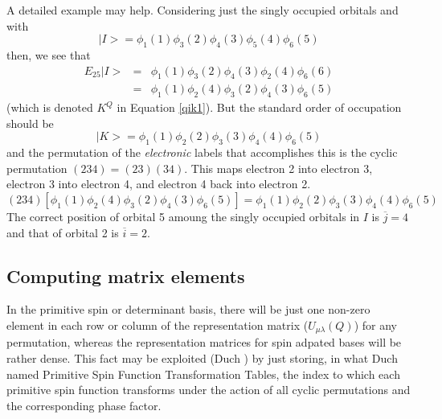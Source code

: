 \documentclass[fullpage,12pt,fleqn]{article}
\begin{document}
A detailed example may help. Considering just the singly occupied
orbitals and with
\begin{equation}
 |I \! > = \phi_1(1) \phi_3(2) \phi_4(3) \phi_5(4) \phi_6(5)
\end{equation}
then, we see that 
\begin{eqnarray}
  E_{25} |I \! >  & = & \phi_1(1) \phi_3(2) \phi_4(3) \phi_2(4)
\phi_6(6) \\
 & = & \phi_1(1) \phi_2(4) \phi_3(2) \phi_4(3) \phi_6(5) 
\end{eqnarray}
(which is denoted $K^Q$ in Equation \ref{qik1}).  But the standard
order of occupation should be
\begin{equation}
  |K \! >  =  \phi_1(1) \phi_2(2) \phi_3(3) \phi_4(4) \phi_6(5)
\end{equation}
and the permutation of the {\em electronic} labels that accomplishes
this is the cyclic permutation $(2 3 4) = (2 3)(3 4)$.  This maps
electron 2 into electron 3, electron 3 into electron 4, and electron 4
back into electron 2.
\begin{equation}
  (2 3 4) \left[ \phi_1(1) \phi_2(4) \phi_3(2) \phi_4(3) \phi_6(5) 
\right] = \phi_1(1) \phi_2(2) \phi_3(3) \phi_4(4) \phi_6(5)
\end{equation}
The correct position of orbital 5 amoung the singly occupied orbitals
in $I$ is $\overline{j}=4$ and that of orbital 2 is $\overline{i}=2$.

\subsection{Computing matrix elements}

In the primitive spin or determinant basis, there will be just one
non-zero element in each row or column of the representation matrix
($U_{\mu \lambda}(Q)$) for any permutation, whereas the representation
matrices for spin adpated bases will be rather dense.  This fact may
be exploited (Duch \cite{duchspinad}) by just storing, in what Duch
named Primitive Spin Function Transformation Tables, the index to which
each primitive spin function transforms under the action of all cyclic
permutations and the corresponding phase factor.
\end{document}

